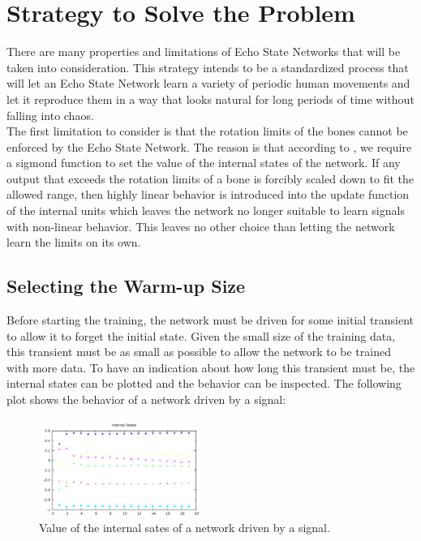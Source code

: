 \documentclass[letterpaper,9pt]{article}
\begin{document}
\section{Strategy to Solve the Problem}

There are many properties and limitations of Echo State Networks that will be taken into consideration. This strategy intends to be a standardized process that will let an Echo State Network learn a variety of periodic human movements and let it reproduce them in a way that looks natural for long periods of time without falling into chaos.\\

The first limitation to consider is that the rotation limits of the bones cannot be enforced by the Echo State Network. The reason is that according to \cite{JaegerESNTutorial}, we require a sigmond function to set the value of the internal states of the network. If any output that exceeds the rotation limits of a bone is forcibly scaled down to fit the allowed range, then highly linear behavior is introduced into the update function of the internal units which leaves the network no longer suitable to learn signals with non-linear behavior. This leaves no other choice than letting the network learn the limits on its own.

\subsection{Selecting the Warm-up Size}

Before starting the training, the network must be driven for some initial transient to allow it to forget the initial state. Given the small size of the training data, this transient must be as small as possible to allow the network to be trained with more data. To have an indication about how long this transient must be, the internal states can be plotted and the behavior can be inspected. The following plot shows the behavior of a network driven by a signal: 

\begin{figure}[h!]
  \centering
    \includegraphics[height=120px]{Extra/walk_initial_states.png}
    \caption[Teacher Forced Internal States]{Value of the internal sates of a network driven by a signal.}
\end{figure}
\end{document}
